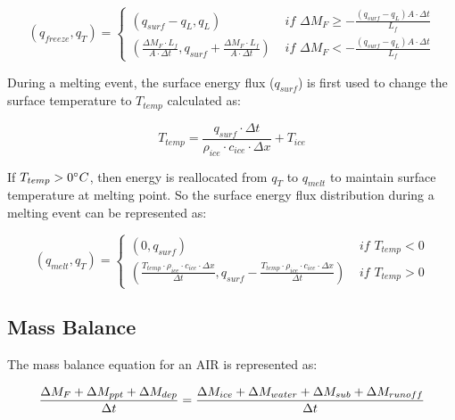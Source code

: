 \documentclass[utf8]{frontiersSCNS} %
\begin{document}
\begin{equation} 
    (q_{freeze}, q_{T}) = \left\{ \begin{array}{ll}
            (q_{surf}-q_{L}, q_{L}) & \textit{ if } \Delta M_{F} \geq -\frac{(q_{surf}-q_{L}) A \cdot \Delta
        t}{L_f} \\
(\frac{\Delta M_{F} \cdot L_f 
        }{A \cdot \Delta t}
        , q_{surf}+\frac{\Delta M_{F} \cdot L_f 
        }{A \cdot \Delta t}) & \textit{ if } \Delta M_{F} < -\frac{(q_{surf}-q_{L}) A \cdot \Delta
        t}{L_f}
    \end{array} \right. 
\end{equation} 

During a melting event, the surface energy flux ($q_{surf}$) is first used to change the surface temperature to
$T_{temp}$ calculated as:

\begin{equation} T_{temp} =\frac{q_{surf} \cdot \Delta t}{\rho_{ice} \cdot c_{ice} \cdot \Delta x} + T_{ice} \end{equation}

If $T_{temp} > 0 \degree C$, then energy is reallocated from $q_{T}$ to $q_{melt}$ to maintain surface temperature at
melting point. So the surface energy flux distribution during a melting event can be represented as:

\begin{equation} 
    (q_{melt}, q_{T}) = \left\{ \begin{array}{ll}
            (0, q_{surf}) & \textit{ if } T_{temp} < 0\\
            (\frac{T_{temp} \cdot \rho_{ice} \cdot c_{ice} \cdot \Delta x}{\Delta t}, q_{surf}-\frac{T_{temp} \cdot \rho_{ice} \cdot c_{ice} \cdot \Delta x}{\Delta t}  ) & \textit{ if } T_{temp} > 0
    \end{array} \right.  
\end{equation} 


\subsection{Mass Balance} 
The mass balance equation for an AIR is represented as:

\begin{equation}
    \frac{\Delta M_{F} + \Delta M_{ppt} + \Delta M_{dep}}{\Delta t} = \frac{\Delta M_{ice} +\Delta M_{water} +
    \Delta M_{sub} + \Delta M_{runoff}}{\Delta t}  \\
    \label{eq:MB} 
\end{equation}
\end{document}
